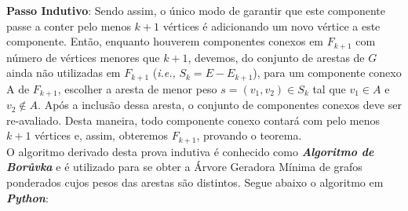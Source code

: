 \documentclass[paper=a4, fontsize=11pt]{scrartcl} %
\numberwithin{equation}{section} %
\numberwithin{figure}{section} %
\numberwithin{table}{section} %
\begin{document}
\textbf{Passo Indutivo}: Sendo assim, o único modo de garantir que este componente passe a conter pelo menos $k+1$ vértices é adicionando um novo vértice a este componente. Então, enquanto houverem componentes conexos em $F_{k+1}$ com número de vértices menores que $k+1$, devemos, do conjunto de arestas de $G$ ainda não utilizadas em $F_{k+1}$ (\textit{i.e.,} $S_k=E-E_{k+1}$), para um componente conexo A de $F_{k+1}$, escolher a aresta de menor peso $s=(v_1,v_2)\in S_k$ tal que $v_1 \in A$ e $v_2 \notin A$. Após a inclusão dessa aresta, o conjunto de componentes conexos deve ser re-avaliado. Desta maneira, todo componente conexo contará com pelo menos $k+1$ vértices e, assim, obteremos $F_{k+1}$, provando o teorema. \\

O algoritmo derivado desta prova indutiva é conhecido como \emph{\textbf{Algoritmo de Borůvka}} e é utilizado para se obter a Árvore Geradora Mínima de grafos ponderados cujos pesos das arestas são distintos. Segue abaixo o algoritmo em \emph{\textbf{Python}}:\\
\end{document}
